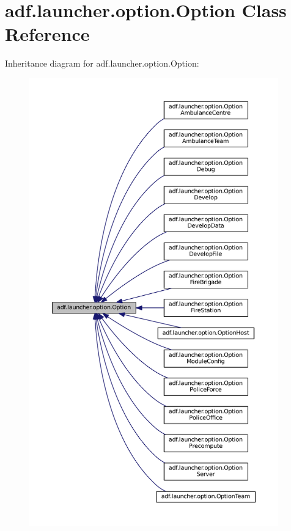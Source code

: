 \hypertarget{classadf_1_1launcher_1_1option_1_1Option}{}\section{adf.\+launcher.\+option.\+Option Class Reference}
\label{classadf_1_1launcher_1_1option_1_1Option}


Inheritance diagram for adf.\+launcher.\+option.\+Option\+:
\nopagebreak
\begin{figure}[H]
\begin{center}
\leavevmode
\includegraphics[height=550pt]{classadf_1_1launcher_1_1option_1_1Option__inherit__graph}
\end{center}
\end{figure}
